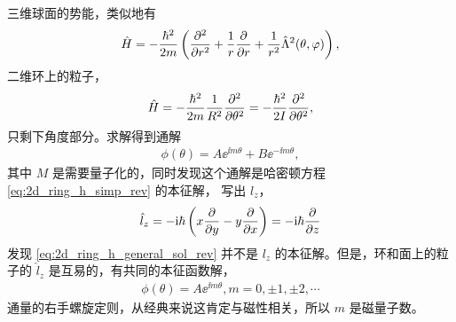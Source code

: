 三维球面的势能，类似地有
\begin{align}
    \hat H = - \frac{\hbar^2}{2m} \left(
        \pdv[2]{r} + \frac1r \pdv{r} + \frac1{r^2} \hat\Lambda^2(\theta,\varphi)
    \right), 
\end{align}
二维环上的粒子，
\begin{align}
    \hat H = - \frac{\hbar^2}{2m} \frac1{R^2} \pdv[2]{\theta} = - \frac{\hbar^2}{2I} \pdv[2]{\theta}, \label{eq:2d_ring_h_simp_rev}
\end{align}
只剩下角度部分。求解得到通解
\begin{align}
    \phi(\theta) = A \ee^{\ii m\theta} + B \ee^{-\ii m \theta},\label{eq:2d_ring_h_general_sol_rev}
\end{align}
其中 $M$ 是需要量子化的，同时发现这个通解是哈密顿方程 \eqref{eq:2d_ring_h_simp_rev} 的本征解，
写出 $l_z$，
\begin{align}
    \hat l_z = - \mathrm{i}\hbar \left(
        x \pdv{y} - y \pdv{x}
    \right) = -\mathrm{i}\hbar \pdv{z}
\end{align}
发现 \eqref{eq:2d_ring_h_general_sol_rev} 并不是 $l_z$ 的本征解。但是，环和面上的粒子的 $\hat l_z$ 是互易的，有共同的本征函数解，
\begin{align}
    \phi(\theta) = A\ee^{\ii m \theta}, m = 0,\pm1,\pm2,\cdots
\end{align}
通量的右手螺旋定则，从经典来说这肯定与磁性相关，所以 $m$ 是磁量子数。

